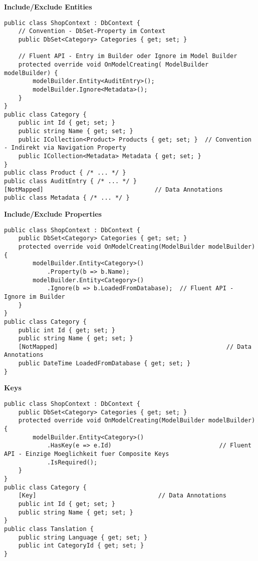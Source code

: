 \textbf{Include/Exclude Entities}
\begin{lstlisting}
public class ShopContext : DbContext {
    // Convention - DbSet-Property im Context
    public DbSet<Category> Categories { get; set; }
    
    // Fluent API - Entry im Builder oder Ignore im Model Builder
    protected override void OnModelCreating( ModelBuilder modelBuilder) {
        modelBuilder.Entity<AuditEntry>();          
        modelBuilder.Ignore<Metadata>();
    }
}
public class Category {
    public int Id { get; set; }
    public string Name { get; set; }
    public ICollection<Product> Products { get; set; }  // Convention - Indirekt via Navigation Property
    public ICollection<Metadata> Metadata { get; set; }
}
public class Product { /* ... */ }
public class AuditEntry { /* ... */ }
[NotMapped]                               // Data Annotations
public class Metadata { /* ... */ }
\end{lstlisting}

\textbf{Include/Exclude Properties}
\begin{lstlisting}
public class ShopContext : DbContext {
    public DbSet<Category> Categories { get; set; }
    protected override void OnModelCreating(ModelBuilder modelBuilder) {
        modelBuilder.Entity<Category>()
            .Property(b => b.Name);                     
        modelBuilder.Entity<Category>()
            .Ignore(b => b.LoadedFromDatabase);  // Fluent API - Ignore im Builder
    }
}
public class Category {
    public int Id { get; set; }
    public string Name { get; set; }
    [NotMapped]                                               // Data Annotations
    public DateTime LoadedFromDatabase { get; set; }
}
\end{lstlisting}

\textbf{Keys}
\begin{lstlisting}
public class ShopContext : DbContext {
    public DbSet<Category> Categories { get; set; }
    protected override void OnModelCreating(ModelBuilder modelBuilder) {
        modelBuilder.Entity<Category>()
            .HasKey(e => e.Id)                              // Fluent API - Einzige Moeglichkeit fuer Composite Keys
            .IsRequired();
    }
}
public class Category {
    [Key]                                  // Data Annotations
    public int Id { get; set; }
    public string Name { get; set; }
}
public class Tanslation {
    public string Language { get; set; }
    public int CategoryId { get; set; }
}
\end{lstlisting}


